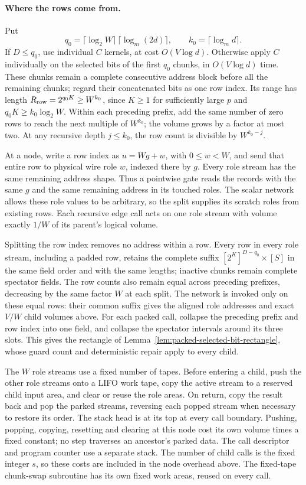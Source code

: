 \documentclass[11pt]{article}
\theoremstyle{definition}
\begin{document}
\paragraph{Where the rows come from.}
Put
\[
 q_0=\lceil\log_2 W\rceil\,
       \lceil\log_m(2d)\rceil,
 \qquad k_0=\lceil\log_m d\rceil.
\]
If \(D\le q_0\), use individual \(C\) kernels, at cost \(O(V\log d)\).
Otherwise apply \(C\) individually on the selected bits of the first
\(q_0\) chunks, in \(O(V\log d)\) time.  These chunks remain a
complete consecutive address block before all the remaining chunks;
regard their concatenated bits as one row index.  Its range has
length \(R_{\rm row}=2^{q_0K}\ge W^{k_0}\), since \(K\ge1\) for sufficiently
large \(p\) and \(q_0K\ge k_0\log_2W\).  Within each preceding prefix, add
the same number of zero rows to reach the next multiple of \(W^{k_0}\);
the volume grows
by a factor at most two.  At any recursive depth \(j\le k_0\), the
row count is divisible by \(W^{k_0-j}\).

At a node, write a row index as \(u=Wg+w\), with \(0\le w<W\),
and send that entire row to physical wire role \(w\), indexed there
by \(g\).  Every role stream has the same remaining address shape.
Thus a pointwise gate reads the records with the same \(g\) and the
same remaining address in its touched roles.  The scalar network
allows these role values to be arbitrary, so the split supplies its
scratch roles from existing rows.  Each recursive edge call acts on
one role stream with volume exactly \(1/W\) of its parent's logical
volume.

Splitting the row index removes no address within a row. Every row in
every role stream, including a padded row, retains the complete suffix
\([2^K]^{D-q_0}\times[S]\) in the same field order and with the same
lengths; inactive chunks remain complete spectator fields. The row
counts also remain equal across preceding prefixes, decreasing by
the same factor \(W\) at each split. The network is invoked only on
these equal rows: their common suffix gives the aligned role addresses
and exact \(V/W\) child volumes above. For each packed call, collapse
the preceding prefix and row index into one field, and collapse the
spectator intervals around its three slots. This gives the rectangle of
Lemma~\ref{lem:packed-selected-bit-rectangle}, whose guard count and
deterministic repair apply to every child.

The \(W\) role streams use a fixed number of tapes.  Before entering a
child, push the other role streams onto a LIFO work tape, copy the
active stream to a reserved child input area, and clear or reuse the
role areas.  On return, copy the result back and pop the parked
streams, reversing each popped stream when necessary to restore its
order.  The stack head is at its top at every call boundary.  Pushing,
popping, copying, resetting and clearing at this node cost its own
volume times a fixed constant; no step traverses an ancestor's parked
data.  The call descriptor and program counter use a separate stack.
The number of child calls is the fixed integer \(s\), so these costs
are included in the node overhead above.  The fixed-tape chunk-swap
subroutine has its own fixed work areas, reused on every call.
\end{document}
